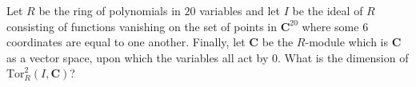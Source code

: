 Let $R$ be the ring of polynomials in $20$ variables and let $I$ be the ideal of $R$ consisting of functions vanishing on the set of points in $\mathbf{C}^{20}$ where some $6$ coordinates are equal to one another. Finally, let $\mathbf{C}$ be the $R$-module which is $\mathbf{C}$ as a vector space, upon which the variables all act by $0$. What is the dimension of $\mathrm{Tor}^2_R(I,\mathbf{C})$?
